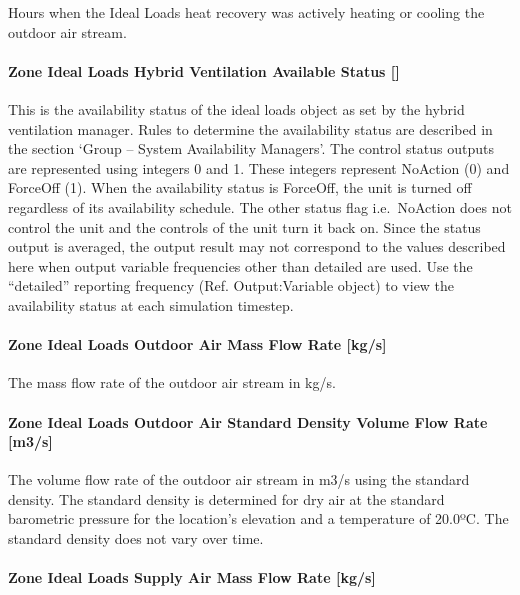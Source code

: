 Hours when the Ideal Loads heat recovery was actively heating or cooling the outdoor air stream.

\paragraph{Zone Ideal Loads Hybrid Ventilation Available Status {[]}}\label{zone-ideal-loads-hybrid-ventilation-available-status}

This is the availability status of the ideal loads object as set by the hybrid ventilation manager. Rules to determine the availability status are described in the section `Group -- System Availability Managers'. The control status outputs are represented using integers 0 and 1. These integers represent NoAction (0) and ForceOff (1). When the availability status is ForceOff, the unit is turned off regardless of its availability schedule. The other status flag i.e.~NoAction does not control the unit and the controls of the unit turn it back on. Since the status output is averaged, the output result may not correspond to the values described here when output variable frequencies other than detailed are used. Use the ``detailed'' reporting frequency (Ref. Output:Variable object) to view the availability status at each simulation timestep.

\paragraph{Zone Ideal Loads Outdoor Air Mass Flow Rate {[}kg/s{]}}\label{zone-ideal-loads-outdoor-air-mass-flow-rate-kgs}

The mass flow rate of the outdoor air stream in kg/s.

\paragraph{Zone Ideal Loads Outdoor Air Standard Density Volume Flow Rate {[}m3/s{]}}\label{zone-ideal-loads-outdoor-air-standard-density-volume-flow-rate-m3s}

The volume flow rate of the outdoor air stream in m3/s using the standard density. The standard density is determined for dry air at the standard barometric pressure for the location's elevation and a temperature of 20.0ºC. The standard density does not vary over time.

\paragraph{Zone Ideal Loads Supply Air Mass Flow Rate {[}kg/s{]}}\label{zone-ideal-loads-supply-air-mass-flow-rate-kgs}

